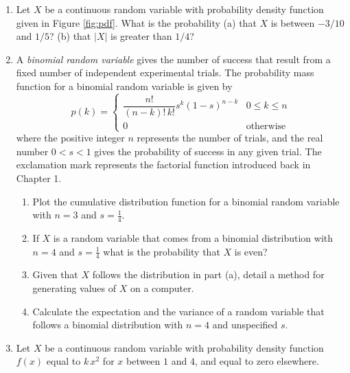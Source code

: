 \documentclass[11pt]{article}
\begin{document}
\begin{enumerate}
\begin{enumerate}
\begin{center}
        \end{center}
      \item Let $X$ be a continuous random variable with probability density function given in Figure \ref{fig:pdf}. What is the probability (a) that $X$ is between $-3/10$ and $1/5$? (b) that $|X|$ is greater than $1/4$? 
      \item A {\it binomial random variable} gives the number of success that result from a fixed number of independent experimental trials. The probability mass function for a binomial random variable is given by
        \[
          p(k)
          =
          \begin{cases}
            \dfrac{n!}{(n-k)!\, k!} s^k (1-s)^{n-k}
                        & 0 \leq k \leq n \\
            0 & \text{otherwise}
          \end{cases}
        \]
        where the positive integer $n$ represents the number of trials, and the real number $0<s<1$ gives the probability of success in any given trial. The exclamation mark represents the factorial function introduced back in Chapter 1.
        \begin{enumerate}
          \item Plot the cumulative distribution function for a binomial random variable with $n=3$ and $s=\frac{1}{4}$.
          \item If $X$ is a random variable that comes from a binomial distribution with $n=4$ and $s=\frac{1}{4}$ what is the probability that $X$ is even?
          \item Given that $X$ follows the distribution in part (a), detail a method for generating values of $X$ on a computer.
          \item Calculate the expectation and the variance of a random variable that follows a binomial distribution with $n=4$ and unspecified $s$.
        \end{enumerate}
      \item Let $X$ be a continuous random variable with probability density function $f(x)$ equal to $k\,x^2$ for $x$ between $1$ and $4$, and equal to zero elsewhere. 

\end{enumerate}
\end{enumerate}
\end{document}
